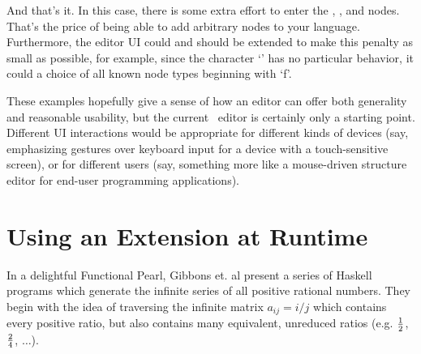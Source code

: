 And that's it. In this case, there is some extra effort to enter the , , and  nodes. That's the price of being able to add arbitrary nodes to your language. Furthermore, the editor UI could and should be extended to make this penalty as small as possible, for example, since the character `' has no particular behavior, it could a choice of all known node types beginning with `f'.

These examples hopefully give a sense of how an editor can offer both generality and reasonable usability, but the current \Meta\ editor is certainly only a starting point. Different UI interactions would be appropriate for different kinds of devices (say, emphasizing gestures over keyboard input for a device with a touch-sensitive screen), or for different users (say, something more like a mouse-driven structure editor for end-user programming applications).


%
%
\section{Using an Extension at Runtime}

In a delightful Functional Pearl\cite{gibbons}, Gibbons et. al present a series of Haskell programs which generate the infinite series of all positive rational numbers. They begin with the idea of traversing the infinite matrix $a_{ij} = i/j$ which contains every positive ratio, but also contains many equivalent, unreduced ratios (e.g. $\nicefrac{1}{2}$, $\nicefrac{2}{4}$, $\dots$).

